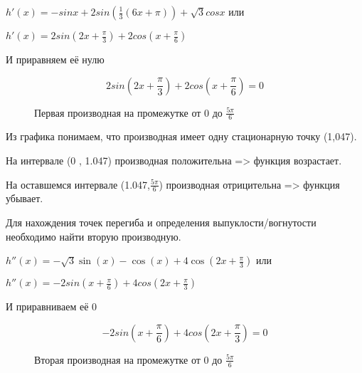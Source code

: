 \documentclass[russian,utf8,nocolumnxxxi,nocolumnxxxii]{eskdtext}
\begin{document}
\begin{enumerate}
        $h'(x)=-sinx+2sin(\frac{1}{3}(6x+\pi))+\sqrt{3}cosx$ или
        
         $h'(x)=2sin(2x+\frac{\pi}{3})+2cos(x+\frac{\pi}{6})$
         
         И приравняем её нулю
         
         $$2sin(2x+\frac{\pi}{3})+2cos(x+\frac{\pi}{6})=0$$
         
          \begin{figure}[h]
      \centering
      \caption{Первая производная на промежутке от 0 до $\frac{5\pi}{6}$}
    
   \end{figure}
  
  Из графика понимаем, что производная имеет одну стационарную точку (1,047).
  
  На интервале (0 , 1.047) производная положительна => функция возрастает.
  
  На оставшемся интервале (1.047,$\frac{5\pi}{6}$) производная отрицительна => функция убывает.
       
        Для нахождения точек перегиба и определения выпуклости/вогнутости необходимо найти вторую производную.
        
        $h''(x) = - \sqrt{3} \sin{\left (x \right )} - \cos{\left (x \right )} + 4 \cos{\left (2 x + \frac{\pi}{3} \right )}$ или
        
        $h''(x) = -2sin(x+\frac{\pi}{6})+4cos(2x+\frac{\pi}{3})$
        
        И приравниваем её 0
        
        $$-2sin(x+\frac{\pi}{6})+4cos(2x+\frac{\pi}{3})=0$$
        
    \begin{figure}[h]
      \centering
      \caption{Вторая производная на промежутке от 0 до $\frac{5\pi}{6}$}
    
   \end{figure}
    

\end{enumerate}
\end{document}
